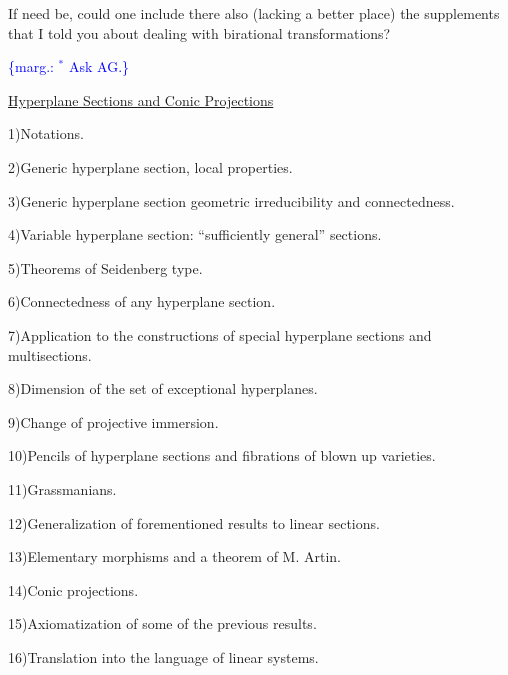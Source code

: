 \documentclass[11pt]{article}
\newcommand{\scanpage}[1]{\par\bigskip\noindent{\small\sffamily[scan #1]}\par}
\newcommand{\mspage}[1]{{\small\sffamily[p.\,#1]}}
\newcommand{\margin}[1]{\textcolor{blue}{\{\textsf{marg.:} #1\}}}
\newcommand{\uline}[1]{\underline{#1}}
\begin{document}
If need be, could one include there also (lacking a better
place) the supplements that I told you about dealing with
birational transformations?

\margin{$^{*}$ Ask AG.}

\clearpage
\scanpage{24/3}
\mspage{3}

\uline{Hyperplane Sections and Conic Projections}

1)\quad Notations.

2)\quad Generic hyperplane section, local properties.

3)\quad Generic hyperplane section geometric irreducibility and
connectedness.

4)\quad Variable hyperplane section: ``sufficiently general''
sections.

5)\quad Theorems of Seidenberg type.

6)\quad Connectedness of any hyperplane section.

7)\quad Application to the constructions of special hyperplane
sections and multisections.

8)\quad Dimension of the set of exceptional hyperplanes.

9)\quad Change of projective immersion.

10)\quad Pencils of hyperplane sections and fibrations of blown up
varieties.

11)\quad Grassmanians.

12)\quad Generalization of forementioned results to linear sections.

13)\quad Elementary morphisms and a theorem of M. Artin.

14)\quad Conic projections.

15)\quad Axiomatization of some of the previous results.

16)\quad Translation into the language of linear systems.

\clearpage
\scanpage{24/4}
\mspage{4}
\end{document}
